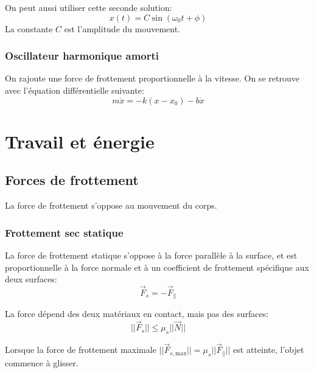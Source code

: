 \documentclass{article}
\numberwithin{equation}{section}
\begin{document}
On peut aussi utiliser cette seconde solution:
\begin{equation}
	\boxed{ x(t) = C \sin(\omega_0 t + \phi) }
\end{equation}
La constante \(C\) est l'amplitude du mouvement.

\subsubsection{Oscillateur harmonique amorti}
On rajoute une force de frottement proportionnelle à la vitesse. On se retrouve avec l'équation différentielle suivante:
\begin{equation}
	\boxed{ m \ddot x = - k(x - x_0) - b \dot x }
\end{equation}



\section{Travail et énergie}

\subsection{Forces de frottement}
La force de frottement s'oppose au mouvement du corps.

\subsubsection{Frottement sec statique}
La force de frottement statique s'oppose à la force parallèle à la surface, et est proportionnelle à la force normale et à un coefficient de frottement spécifique aux deux surfaces:
\begin{equation*}
	\vec F_s = - \vec F_\parallel
\end{equation*}

La force dépend des deux matériaux en contact, mais pas des surfaces:
\begin{equation}
	\boxed{ ||\vec F_s|| \leq \mu_s||\vec N|| }
\end{equation}

Lorsque la force de frottement maximale \( || \vec F_{s, \text{max}} || = \mu_s || \vec F_\parallel ||\) est atteinte, l'objet commence à glisser. 
\end{document}
